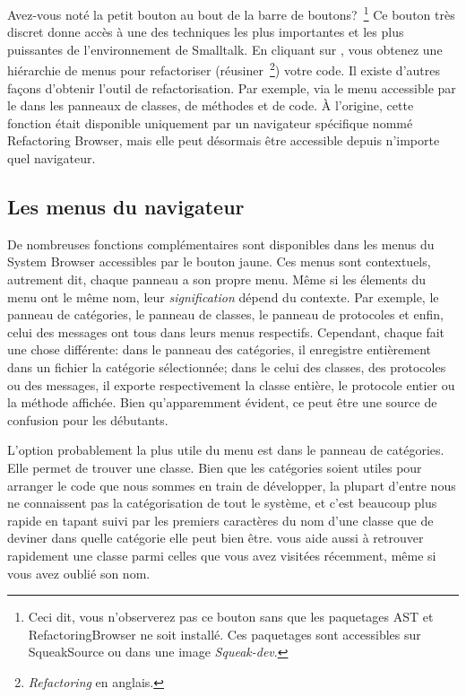 \documentclass[a4paper,10pt,twoside]{book}
\begin{document}
Avez-vous not\'e la petit bouton  au bout de la barre de 
boutons?~\footnote{Ceci dit, vous n'observerez pas ce bouton sans
que les paquetages AST et RefactoringBrowser ne soit install\'e. Ces
paquetages sont accessibles sur SqueakSource ou dans une image \emph{Squeak-dev}.}
Ce bouton tr\`es discret donne acc\`es \`a une des techniques
les plus importantes et les plus puissantes de l'environnement de
Smalltalk.
En cliquant sur , vous obtenez une hi\'erarchie de menus
pour refactoriser (\cad r\'eusiner~\footnote{\emph{Refactoring} en anglais.}) votre code.
Il existe d'autres fa\c{c}ons d'obtenir l'outil de refactorisation. Par
exemple, via le menu accessible par le  dans les
panneaux de classes, de m\'ethodes et de code.
\`A l'origine, cette fonction \'etait disponible uniquement
par un navigateur sp\'ecifique nomm\'e Refactoring Browser, mais
elle peut d\'esormais \^etre accessible depuis n'importe quel navigateur.

\subsection{Les menus du navigateur}

De nombreuses fonctions compl\'ementaires sont disponibles dans les menus du
System Browser accessibles par le bouton jaune. Ces menus sont contextuels, 
autrement dit, chaque panneau a son propre menu.
M\^eme si les \'elements du menu ont le m\^eme nom, leur \emph{signification}
d\'epend du contexte. Par exemple, le panneau de cat\'egories, le
panneau de classes, le panneau de protocoles et enfin, celui des messages
ont tous  dans leurs menus respectifs. Cependant, chaque 
 fait une chose diff\'erente: dans le panneau des cat\'egories,
il enregistre enti\`erement dans un fichier la cat\'egorie s\'electionn\'ee; dans le celui des classes, des protocoles ou des messages, il exporte respectivement la classe enti\`ere, le protocole entier ou la m\'ethode affich\'ee.
Bien qu'apparemment \'evident, ce peut \^etre une source de confusion pour
les d\'ebutants. 

L'option probablement la plus utile du menu est  
dans le panneau de cat\'egories. 
Elle permet de trouver une classe.  
Bien que les cat\'egories soient utiles pour arranger le code que nous 
sommes en train de d\'evelopper, la plupart d'entre nous ne connaissent pas
la cat\'egorisation de tout le syst\`eme, et c'est beaucoup plus rapide
en tapant  suivi par les premiers caract\`eres du nom d'une 
classe que de deviner dans quelle cat\'egorie elle peut bien \^etre.
 vous aide aussi \`a retrouver rapidement
une classe parmi celles que vous avez visit\'ees r\'ecemment, m\^eme si vous
avez oubli\'e son nom.
\end{document}
